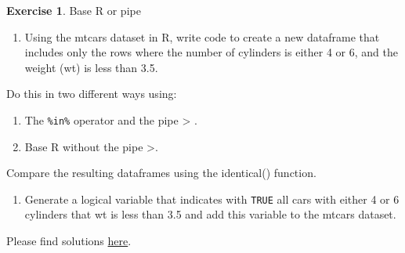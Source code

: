 \documentclass[
  12pt,
  oneside]{book}
\providecommand{\tightlist}{%
  \setlength{\itemsep}{0pt}\setlength{\parskip}{0pt}}
\theoremstyle{definition}
\theoremstyle{definition}
\theoremstyle{definition}
\newtheorem{exercise}{Exercise}[chapter]
\theoremstyle{definition}
\theoremstyle{remark}
\begin{document}
\begin{exercise}
\protect\hypertarget{exr:baseorpipe}{}\label{exr:baseorpipe}Base R or pipe

\begin{enumerate}
\def\labelenumi{\alph{enumi})}
\tightlist
\item
  Using the mtcars dataset in R, write code to create a new dataframe that includes only the rows where the number of cylinders is either 4 or 6, and the weight (wt) is less than 3.5.
\end{enumerate}

Do this in two different ways using:

\begin{enumerate}
\def\labelenumi{\arabic{enumi}.}
\tightlist
\item
  The \texttt{\%in\%} operator and the pipe \textbar\textgreater{} .
\item
  Base R without the pipe \textbar\textgreater.
\end{enumerate}

Compare the resulting dataframes using the identical() function.

\begin{enumerate}
\def\labelenumi{\alph{enumi})}
\setcounter{enumi}{1}
\tightlist
\item
  Generate a logical variable that indicates with \texttt{TRUE} all cars with either 4 or 6 cylinders that wt is less than 3.5 and add this variable to the mtcars dataset.
\end{enumerate}

Please find solutions \href{https://raw.githubusercontent.com/hubchev/courses/main/scr/exe_base_pipe.R}{here}.
\end{exercise}
\end{document}
